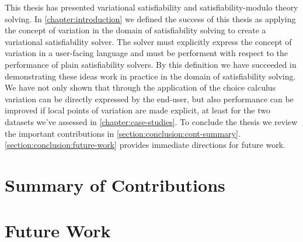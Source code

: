 \label{chapter:conclusion}
%
This thesis has presented variational satisfiability and satisfiability-modulo
theory solving. In \autoref{chapter:introduction} we defined the success of this
thesis as applying the concept of variation in the domain of satisfiability
solving to create a variational satisfiability solver. The solver must
explicitly express the concept of variation in a user-facing language and must
be performent with respect to the performance of plain satisfiability solvers.
By this definition we have succeeded in demonstrating these ideas work in
practice in the domain of satisfiability solving. We have not only shown that
through the application of the choice calculus variation can be directly
expressed by the end-user, but also
performance can be improved if local points of variation are made explicit, at
least for the two datasets we've assessed in \autoref{chapter:case-studies}.
%
To conclude the thesis we review the important contributions in
\autoref{section:conclusion:cont-summary}.
\autoref{section:conclusion:future-work} provides immediate directions for
future work.

\section{Summary of Contributions}

%
\section{Future Work}

%





